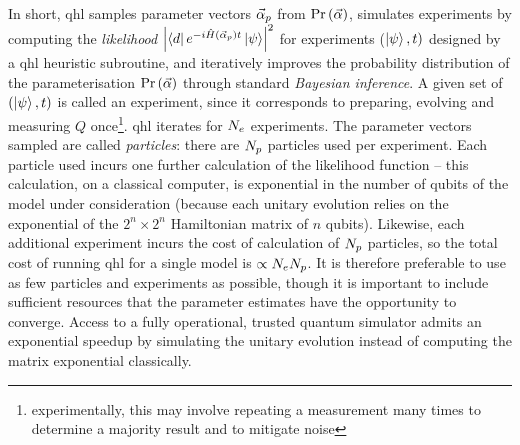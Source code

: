 In short, \gls{qhl} samples parameter vectors $\vec{\alpha}_p$ from $\Pr\left(\vec{\alpha}\right)$, 
    simulates experiments by computing the \emph{likelihood} $\left| \bra{d} e^{-i \hat{H}(\vec{\alpha}_p)t} \ket{\psi} \right|^2$
    for experiments ($\ket{\psi}, t)$ designed by a \gls{qhl} heuristic subroutine, 
    and iteratively improves the probability distribution of the parameterisation $\Pr\left(\vec{\alpha}\right)$ 
    through standard \emph{Bayesian inference}. 
A given set of $(\ket{\psi}, t)$ is called an experiment, since it corresponds to preparing, evolving and measuring $Q$ 
once\footnote{experimentally, this may involve repeating a measurement many times to determine a majority result and to mitigate noise}. 
\gls{qhl} iterates for $N_e$ experiments. 
The parameter vectors sampled are called \emph{particles}: there are $N_p$ particles used per experiment. 
Each particle used incurs one further calculation of the likelihood function -- 
    this calculation, on a classical computer, is exponential in the number of qubits of the model under consideration
    (because each unitary evolution relies on the exponential of the $2^n \times 2^n$ Hamiltonian matrix of $n$ qubits). 
Likewise, each additional experiment incurs the cost of calculation of $N_p$ particles, 
    so the total cost of running \gls{qhl} for a single model is $\propto N_e N_p$.
It is therefore preferable to use as few particles and experiments as possible, 
    though it is important to include sufficient resources that the parameter estimates have the opportunity to converge. 
Access to a fully operational, trusted quantum simulator admits an exponential 
    speedup by simulating the unitary evolution instead of computing the matrix exponential classically.
\par 

